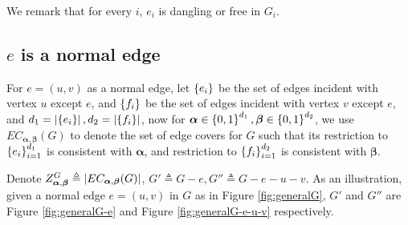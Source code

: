 We remark that for every $i$, $e_i$ is dangling or free in $G_i$.

\subsection{$e$ is a normal edge}


	For $e=(u,v)$ as a normal edge, let $\left\{e_i\right\}$ be the set of edges incident with vertex $u$ except $e$, and $\left\{f_i\right\}$ be the set of edges incident with vertex $v$ except $e$, and $d_1 = \left\vert\left\{e_i\right\}\right\vert, d_2 = \left\vert\left\{f_i\right\}\right\vert$, now for $\boldsymbol\alpha \in \left\{0,1\right\}^{d_1}, \boldsymbol\beta \in \left\{0,1\right\}^{d_2}$, we use $EC_{\boldsymbol\alpha,\boldsymbol\beta}(G)$ to denote the set of edge covers for $G$ such that its restriction to $\left\{e_i\right\}_{i=1}^{d_1}$ is consistent with $\boldsymbol\alpha$, and restriction to $\left\{f_i\right\}_{i=1}^{d_2}$ is consistent with $\boldsymbol\beta$.

	Denote $Z_{\boldsymbol\alpha, \boldsymbol\beta}^G \triangleq \left\vert EC_{\boldsymbol\alpha, \boldsymbol\beta}(G)\right\vert$, $G' \triangleq G-e, G'' \triangleq G-e-u-v$. As an illustration, given a normal edge $e=(u,v)$ in $G$ as in Figure \ref{fig:generalG}, $G'$ and $G''$ are Figure \ref{fig:generalG-e} and Figure \ref{fig:generalG-e-u-v} respectively.


